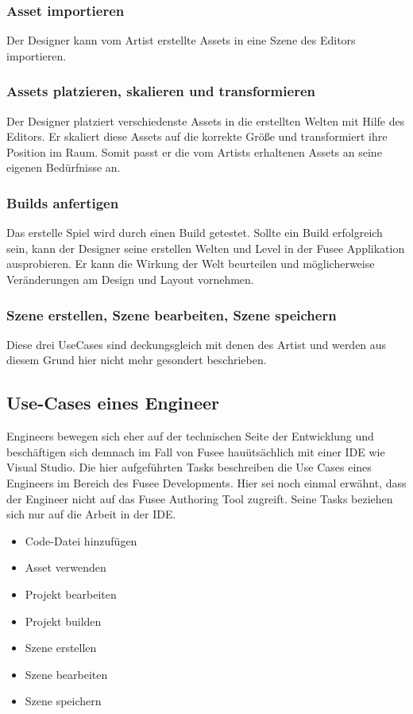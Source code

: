 \documentclass[pagesize, paper=a4, fontsize=12pt, titlepage=true, headings=small, headnosepline, abstractoff, liststotoc, nochapterprefix, plainheadsepline, twoside]{scrreprt}
\begin{document}
\subsubsection{Asset importieren}
Der Designer kann vom Artist erstellte Assets in eine Szene des Editors importieren. 
\subsubsection{Assets platzieren, skalieren und transformieren}
Der Designer platziert verschiedenste Assets in die erstellten Welten mit Hilfe des Editors. Er skaliert diese Assets auf die korrekte Größe und transformiert ihre Position im Raum. Somit passt er die vom Artists erhaltenen Assets an seine eigenen Bedürfnisse an. 
\subsubsection{Builds anfertigen}
Das erstelle Spiel wird durch einen Build getestet. Sollte ein Build erfolgreich sein, kann der Designer seine erstellen Welten und Level in der Fusee Applikation ausprobieren. Er kann die Wirkung der Welt beurteilen und möglicherweise Veränderungen am Design und Layout vornehmen.
\subsubsection{Szene erstellen, Szene bearbeiten, Szene speichern}
Diese drei UseCases sind deckungsgleich mit denen des Artist und werden aus diesem Grund hier nicht mehr gesondert beschrieben.

\subsection{Use-Cases eines Engineer}
Engineers bewegen sich eher auf der technischen Seite der Entwicklung und beschäftigen sich demnach im Fall von Fusee hauütsächlich mit einer IDE wie Visual Studio. Die hier aufgeführten Tasks beschreiben die Use Cases eines Engineers im Bereich des Fusee Developments. Hier sei noch einmal erwähnt, dass der Engineer nicht auf das Fusee Authoring Tool zugreift. Seine Tasks beziehen sich nur auf die Arbeit in der IDE.

\begin{itemize}
\item Code-Datei hinzufügen
\item Asset verwenden
\item Projekt bearbeiten
\item Projekt builden
\item Szene erstellen
\item Szene bearbeiten
\item Szene speichern
\end{itemize}
\end{document}
